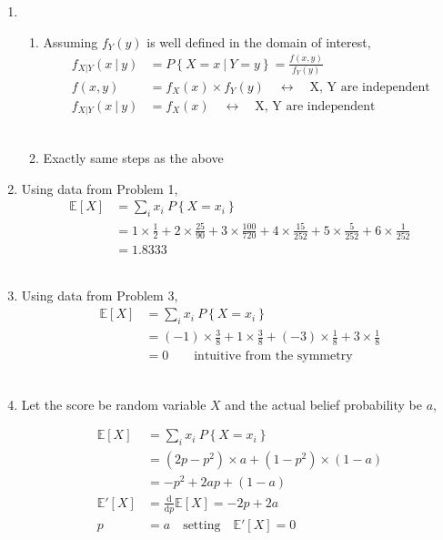 \begin{enumerate}
	
	\item 
	
		\begin{enumerate}
			\item Assuming $ f_Y (y) $ is well defined in the domain of interest,
			\begin{align}
				f_{X|Y}(x\ |\ y) &= P \left\{ X = x\ |\ Y = y \right\} = \frac{f(x, y)}{f_Y(y)} \nonumber\\
				f(x,y) &= f_X (x) \times f_Y (y) \quad \leftrightarrow \quad \text{X, Y are independent}  \nonumber\\
				f_{X|Y}(x\ |\ y) &= f_X (x) \quad \leftrightarrow \quad \text{X, Y are independent}
			\end{align} \\
			
			\item Exactly same steps as the above
		\end{enumerate}
	
	
	\item Using data from Problem 1,
	\begin{align}
		\mathbb{E}[X] &= \sum\limits_{i} x_i\ P \left\{ X = x_i \right\} \nonumber \\
		&= 1 \times \frac{1}{2} + 2 \times \frac{25}{90} + 3 \times \frac{100}{720} + 4 \times \frac{15}{252} + 5 \times \frac{5}{252} + 6 \times \frac{1}{252} \nonumber \\
		&= 1.8333
	\end{align} \\
	
	\item Using data from Problem 3,
	\begin{align}
		\mathbb{E}[X] &= \sum\limits_{i} x_i\ P \left\{ X = x_i \right\} \nonumber \\
		&= (-1) \times \frac{3}{8} + 1 \times \frac{3}{8} + (-3) \times \frac{1}{8} + 3 \times \frac{1}{8} \nonumber \\
		&= 0 \qquad \text{intuitive from the symmetry}
	\end{align} \\
	
	\item Let the score be random variable $ X $ and the actual belief probability be $ a $,
	
		\begin{align}
			\mathbb{E}[X] &= \sum\limits_{i} x_i\ P \left\{ X = x_i \right\} \nonumber \\
			&= (2p - p^2)	 \times a +  (1 - p^2) \times (1-a) \nonumber \\
			&= -p^2 + 2ap + (1-a) \nonumber \\
			\mathbb{E}'[X] &= \frac{\mathrm{d}}{\mathrm{d} p} \mathbb{E}[X] = -2p + 2a \\
			p &= a \quad \text{setting} \quad 	\mathbb{E}'[X] = 0
		\end{align} \\
	

\end{enumerate}

